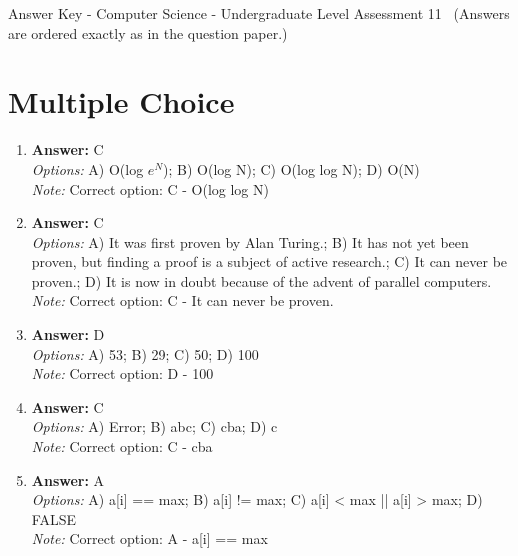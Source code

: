 \documentclass[12pt]{article}
\begin{document}
\begin{center}
Answer Key - Computer Science - Undergraduate Level Assessment 11 \
\small (Answers are ordered exactly as in the question paper.)
\end{center}

\section*{Multiple Choice}
\begin{enumerate}[label=\arabic*.]
\item \textbf{Answer:} C
\\ \textit{Options:} A) O(log $e^N$); B) O(log N); C) O(log log N); D) O(N)
\\ \textit{Note:} Correct option: C - O(log log N)
\item \textbf{Answer:} C
\\ \textit{Options:} A) It was first proven by Alan Turing.; B) It has not yet been proven, but finding a proof is a subject of active research.; C) It can never be proven.; D) It is now in doubt because of the advent of parallel computers.
\\ \textit{Note:} Correct option: C - It can never be proven.
\item \textbf{Answer:} D
\\ \textit{Options:} A) 53; B) 29; C) 50; D) 100
\\ \textit{Note:} Correct option: D - 100
\item \textbf{Answer:} C
\\ \textit{Options:} A) Error; B) abc; C) cba; D) c
\\ \textit{Note:} Correct option: C - cba
\item \textbf{Answer:} A
\\ \textit{Options:} A) a[i] == max; B) a[i] != max; C) a[i] \textless{} max || a[i] \textgreater{} max; D) FALSE
\\ \textit{Note:} Correct option: A - a[i] == max
\end{enumerate}
\end{document}
